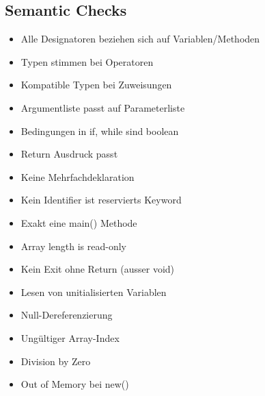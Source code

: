 \subsection{Semantic Checks}
\begin{itemize}
    \item Alle Designatoren beziehen sich auf Variablen/Methoden
    \item Typen stimmen bei Operatoren
    \item Kompatible Typen bei Zuweisungen
    \item Argumentliste passt auf Parameterliste
    \item Bedingungen in if, while sind boolean
    \item Return Ausdruck passt
    \item Keine Mehrfachdeklaration
    \item Kein Identifier ist reservierts Keyword
    \item Exakt eine main() Methode
    \item Array length  is read-only
    \item Kein Exit ohne Return (ausser void)
    \item Lesen von unitialisierten Variablen
    \item Null-Dereferenzierung
    \item Ungültiger Array-Index
    \item Division by Zero
    \item Out of Memory bei new()
\end{itemize}